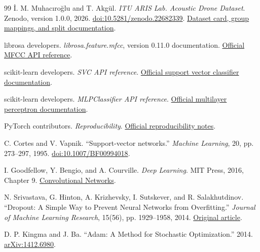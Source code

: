 \documentclass[11pt,letterpaper]{article}
\begin{document}
\begin{thebibliography}{99}
\.I. M. Muhac{\i}ro{\u{g}}lu and T. Akg\"ul.
\emph{ITU ARIS Lab. Acoustic Drone Dataset}.
Zenodo, version 1.0.0, 2026.
\href{https://doi.org/10.5281/zenodo.22682339}{doi:10.5281/zenodo.22682339}.
\href{https://huggingface.co/datasets/imm61/itu-aris-lab-acoustic-drone-dataset}{Dataset card, group mappings, and split documentation}.

librosa developers. \emph{librosa.feature.mfcc}, version 0.11.0 documentation.
\href{https://librosa.org/doc/0.11.0/generated/librosa.feature.mfcc.html}{Official MFCC API reference}.

scikit-learn developers. \emph{SVC API reference}.
\href{https://scikit-learn.org/stable/modules/generated/sklearn.svm.SVC.html}{Official support vector classifier documentation}.

scikit-learn developers. \emph{MLPClassifier API reference}.
\href{https://scikit-learn.org/stable/modules/generated/sklearn.neural_network.MLPClassifier.html}{Official multilayer perceptron documentation}.

PyTorch contributors. \emph{Reproducibility}.
\href{https://docs.pytorch.org/docs/stable/notes/randomness.html}{Official reproducibility notes}.

C. Cortes and V. Vapnik. ``Support-vector networks.''
\emph{Machine Learning}, 20, pp. 273--297, 1995.
\href{https://doi.org/10.1007/BF00994018}{doi:10.1007/BF00994018}.

I. Goodfellow, Y. Bengio, and A. Courville. \emph{Deep Learning}.
MIT Press, 2016, Chapter 9.
\href{https://www.deeplearningbook.org/contents/convnets.html}{Convolutional Networks}.

N. Srivastava, G. Hinton, A. Krizhevsky, I. Sutskever, and R. Salakhutdinov.
``Dropout: A Simple Way to Prevent Neural Networks from Overfitting.''
\emph{Journal of Machine Learning Research}, 15(56), pp. 1929--1958, 2014.
\href{https://www.jmlr.org/papers/v15/srivastava14a.html}{Original article}.

D. P. Kingma and J. Ba. ``Adam: A Method for Stochastic Optimization.''
2014. \href{https://arxiv.org/abs/1412.6980}{arXiv:1412.6980}.
\end{thebibliography}
\end{document}
